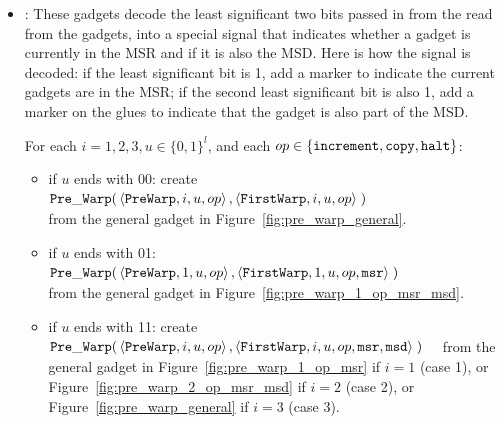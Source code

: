 \begin{itemize}

    \item {\prewarp}:
    These gadgets decode the least significant two bits passed in from the read from the {\cread} gadgets, into a special signal that indicates whether a gadget is currently in the MSR and if it is also the MSD.
    Here is how the signal is decoded: if the least significant bit is 1, add a marker to indicate the current gadgets are in the MSR; if the second least significant bit is also 1, add a marker on the glues to indicate that the gadget is also part of the MSD.

    For each $i = 1,2,3, u \in \{0, 1\}^l$, and each $op \in \{ {\tt increment}, {\tt copy}, {\tt halt} \}$:
    \begin{itemize}
        \item if $u$ ends with 00:
        create
        $\begin{aligned}[t]
            {\tt Pre\_Warp}(& \left\langle {\tt PreWarp},   i, u, op \right\rangle,
                       \left\langle {\tt FirstWarp}, i, u, op \right\rangle \;)
        \end{aligned}$ \\ from the general gadget in Figure~\ref{fig:pre_warp_general}.

        \item if $u$ ends with 01:
        $\begin{aligned}[t]
            {\tt Pre\_Warp}(& \left\langle {\tt PreWarp},   1, u, op            \right\rangle,
                       \left\langle {\tt FirstWarp}, 1, u, op, {\tt msr} \right\rangle \;)
        \end{aligned}$ \\ from the general gadget in Figure~\ref{fig:pre_warp_1_op_msr_msd}.

        \item if $u$ ends with 11:
        create
        $\begin{aligned}[t]
            {\tt Pre\_Warp}(& \left\langle {\tt PreWarp},   i, u, op                       \right\rangle,
                       \left\langle {\tt FirstWarp}, i, u, op, {\tt msr}, {\tt msd} \right\rangle \;)
        \end{aligned}$ from the general gadget in Figure~\ref{fig:pre_warp_1_op_msr} if $i = 1$ (case 1),
        or Figure~\ref{fig:pre_warp_2_op_msr_msd} if $i = 2$ (case 2), or Figure~\ref{fig:pre_warp_general} if $i = 3$ (case 3).
    \end{itemize}
    \vspace{.5cm}


\end{itemize}

